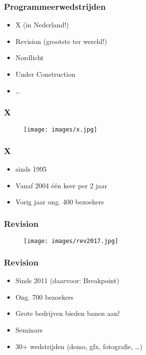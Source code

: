 \documentclass[aspectratio=43]{uva-inf-presentation}
\begin{document}

\begin{frame}
\frametitle{Programmeerwedstrijden}

\begin{itemize}
\item X (in Nederland!)
\item Revision (grootste ter wereld!)
\item Nordlicht
\item Under Construction
\item \dots
\end{itemize}

\end{frame}


\begin{frame}
\frametitle{X}

\begin{figure}
\texttt{[image: images/x.jpg]}
\end{figure}

\end{frame}


\begin{frame}
\frametitle{X}

\begin{itemize}
\item sinds 1995
\item Vanaf 2004 \'e\'en keer per 2 jaar
\item Vorig jaar ong. 400 bezoekers
\end{itemize}

\end{frame}


\begin{frame}
\frametitle{Revision}

\begin{figure}
\texttt{[image: images/rev2017.jpg]}
\end{figure}

\end{frame}


\begin{frame}
\frametitle{Revision}

\begin{itemize}
\item Sinds 2011 (daarvoor: Breakpoint)
\item Ong. 700 bezoekers
\item Grote bedrijven bieden banen aan!
\item Seminars
\item 30+ wedstrijden (demo, gfx, fotografie, \dots)
\end{itemize}

\end{frame}
\end{document}

